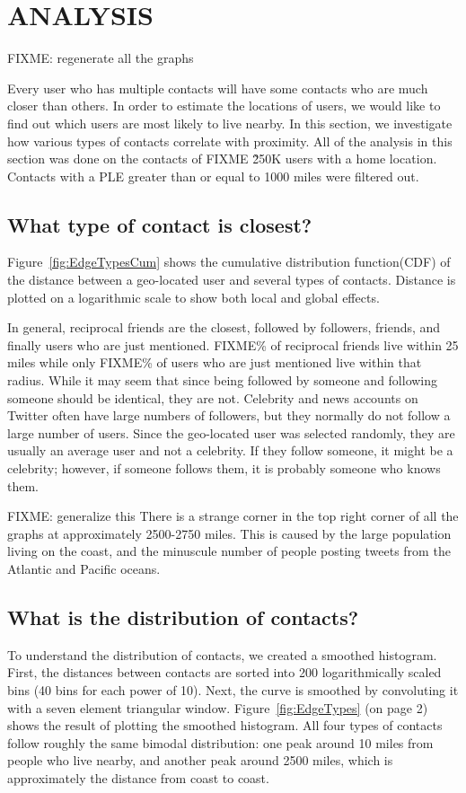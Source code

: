 
\chapter{\uppercase{Analysis}}

FIXME: regenerate all the graphs

Every user who has multiple contacts will have some contacts who are much
closer than others. In order to estimate the locations of users, we would like
to find out which users are most likely to live nearby.  In this section, we
investigate how various types of contacts correlate with proximity.
All of the analysis in this section was done on the contacts of FIXME \~250K users
with a home location.
Contacts with a PLE greater than or equal to 1000 miles were filtered out.

\section{What type of contact is closest?}

Figure~\ref{fig:EdgeTypesCum} shows the cumulative distribution
function(CDF) of the distance between a geo-located user and several types of
contacts.
Distance is plotted on a logarithmic scale to show both local and
global effects.

In general, reciprocal friends are the closest, followed by followers, friends,
and finally users who are just mentioned.
FIXME\% of reciprocal friends live within 25 miles while only FIXME\% of users
who are just mentioned live within that radius.
While it may seem that since being followed by someone and following someone
should be identical, they are not.
Celebrity and news accounts on Twitter often have large numbers of followers,
but they normally do not follow a large number of users.
Since the geo-located user was selected randomly, they are usually an average
user and not a celebrity.
If they follow someone, it might be a celebrity; however, if someone follows
them, it is probably someone who knows them.

FIXME: generalize this
There is a strange corner in the top right corner of all the graphs at
approximately 2500-2750 miles.
This is caused by the large population living on the coast, and the minuscule
number of people posting tweets from the Atlantic and Pacific oceans.

\section{What is the distribution of contacts?}
To understand the distribution of contacts, we created a smoothed histogram.
First, the distances between contacts are sorted into 200 logarithmically
scaled bins (40 bins for each power of 10). Next, the curve is smoothed by
convoluting it with a seven element triangular window.
Figure~\ref{fig:EdgeTypes} (on page 2) shows the result of plotting the
smoothed histogram.
All four types of contacts follow roughly the same bimodal
distribution: one peak around 10 miles from people who live nearby, and another
peak around 2500 miles, which is approximately the distance from coast to
coast.

